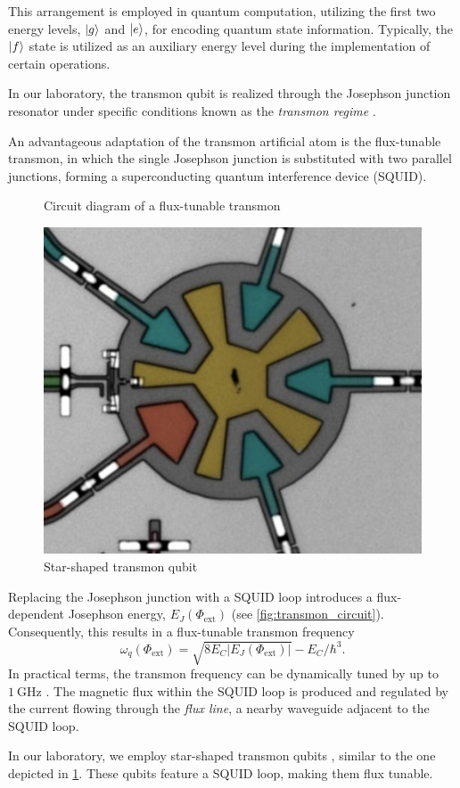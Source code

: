 This arrangement is employed in quantum computation, utilizing the first two energy levels, $\ket{g}$ and $\ket{e}$, for encoding quantum state information. 
Typically, the $\ket{f}$ state is utilized as an auxiliary energy level during the implementation of certain operations.

In our laboratory, the transmon qubit is realized through the Josephson junction resonator under specific conditions known as the \emph{transmon regime} \cite{transmon_regime}.

An advantageous adaptation of the transmon artificial atom is the flux-tunable transmon, in which the single Josephson junction is substituted with two parallel junctions, forming a superconducting quantum interference device (SQUID).
\begin{figure}
    \begin{minipage}[b]{0.5\linewidth}
      \centering
      
      \captionsetup{skip=-20pt}
      \caption{Circuit diagram of a flux-tunable transmon}
      \label{fig:transmon_circuit}
    \end{minipage}
    \hfill
    \begin{minipage}[b]{0.45\linewidth}
      \centering
      \includegraphics[width = 0.5 \textwidth]{Images/Chap1/star_transmon.png}
      \caption{Star-shaped transmon qubit}
      \label{fig:star_transmon}
    \end{minipage}
  \end{figure}

Replacing the Josephson junction with a SQUID loop introduces a flux-dependent Josephson energy, $E_J(\Phi_\text{ext})$ (see \cref{fig:transmon_circuit}).
Consequently, this results in a flux-tunable transmon frequency 
\begin{equation}
    \omega_q(\Phi_\text{ext}) = \sqrt{8 E_C|E_J(\Phi_\text{ext})|} - E_C/\hbar^3.
\end{equation}
In practical terms, the transmon frequency can be dynamically tuned by up to $\SI{1}{\giga\hertz}$ \cite{di_carlo}.
The magnetic flux within the SQUID loop is produced and regulated by the current flowing through the \emph{flux line}, a nearby waveguide adjacent to the SQUID loop.

In our laboratory, we employ star-shaped transmon qubits \cite{transmon_qubits}, similar to the one depicted in \cref{fig:star_transmon}.
These qubits feature a SQUID loop, making them flux tunable.



